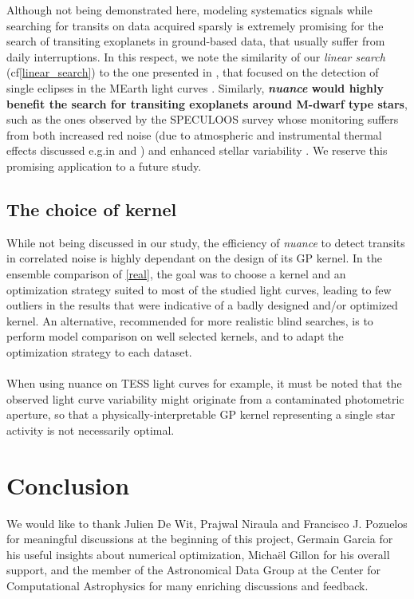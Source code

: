 \documentclass[modern]{aastex631}
\newcommand{\nuancemethod}{\textit{nuance}}
\newcommand{\nuancecode}{\textsf{nuance}}
\begin{document}
Although not being demonstrated here, modeling systematics signals while searching for transits on data acquired sparsly is extremely promising for the search of transiting exoplanets in ground-based data, that usually suffer from daily interruptions. In this respect, we note the similarity of our \textit{linear search} (cf\;\autoref{linear_search}) to the one presented in \citealt{Berta2012}, that focused on the detection of single eclipses in the MEarth light curves \citep{Irwin2009}. Similarly, \textbf{\nuancemethod{} would highly benefit the search for transiting exoplanets around M-dwarf type stars}, such as the ones observed by the SPECULOOS survey \citep{speculoos} whose monitoring suffers from both increased red noise (due to atmospheric and instrumental thermal effects discussed e.g.\;in \citealt{Berta2012} and  \citealt{Pedersen2023}) and enhanced stellar variability \citep{Murray2020}. We reserve this promising application to a future study.

\subsection{The choice of kernel}
While not being discussed in our study, the efficiency of \nuancemethod{} to detect transits in correlated noise is highly dependant on the design of its GP kernel. In the ensemble comparison of \autoref{real}, the goal was to choose a kernel and an optimization strategy suited to most of the studied light curves, leading to few outliers in the results that were indicative of a badly designed and/or optimized kernel. An alternative, recommended for more realistic blind searches, is to perform model comparison on well selected kernels, and to adapt the optimization strategy to each dataset.\\\\
When using \nuancecode{} on TESS light curves for example, it must be noted that the observed light curve variability might originate from a contaminated photometric aperture, so that a physically-interpretable GP kernel representing a single star activity is not necessarily optimal.

\section{Conclusion}



We would like to thank Julien De Wit, Prajwal Niraula and Francisco J. Pozuelos for meaningful discussions at the beginning of this project, Germain Garcia for his useful insights about numerical optimization, Michaël Gillon for his overall support, and the member of the Astronomical Data Group at the Center for Computational Astrophysics for many enriching discussions and feedback.
\end{document}
